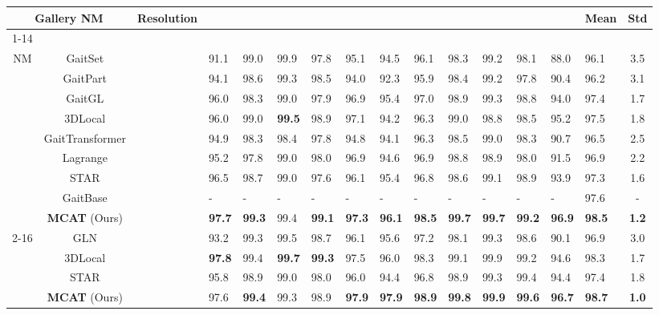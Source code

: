 \documentclass[journal]{IEEEtran}
\begin{document}
\begin{table*}[t]
\begin{center}
\footnotesize
\caption{Averaged rank-1 accuracies (\%) on CASIA-B, excluding identical-view cases. Std denotes the performance sample standard deviation across 11 views.}
\begin{tabular}{|c|c|c| l l l l l l l l l l l|l|c|}
\hline
\multicolumn{2}{|c|}{Gallery NM} & Resolution & \multicolumn{11}{c|}{} & \multirow{2}{*}{Mean} & \multirow{2}{*}{Std} \\\cline{1-14}
\multicolumn{2}{|c|}{Probe} &  &  &  &  &  &  &  &  &  &  &  &  & & \\\hline
\multirow{7}{*}{NM} & GaitSet\cite{chao2021gaitset} &  & 91.1 & 99.0 & 99.9 & 97.8 & 95.1 & 94.5 & 96.1 & 98.3 & 99.2 & 98.1 & 88.0 & 96.1 & 3.5\\
& GaitPart \cite{fan2020gaitpart} &  & 94.1 & 98.6 & 99.3 & 98.5 & 94.0 & 92.3 & 95.9 & 98.4 & 99.2 & 97.8 & 90.4 & 96.2 & 3.1 \\
& GaitGL \cite{GaitGL} &  & 96.0 & 98.3 & 99.0 & 97.9 & 96.9 & 95.4 & 97.0 & 98.9 & 99.3 & 98.8 & 94.0 & 97.4 & 1.7 \\
& 3DLocal \cite{local3D} &  & 96.0 & 99.0 & \textbf{99.5} & 98.9 & 97.1 & 94.2 & 96.3 & 99.0 & 98.8 & 98.5 & 95.2 & 97.5 & 1.8 \\
& GaitTransformer \cite{cui2022gaittransformer} &  & 94.9 & 98.3 & 98.4 & 97.8 & 94.8 & 94.1 & 96.3 & 98.5 & 99.0 & 98.3 & 90.7 & 96.5 & 2.5 \\
& Lagrange \cite{chai2022lagrange} &  & 95.2 & 97.8 & 99.0 & 98.0 & 96.9 & 94.6 & 96.9 & 98.8 & 98.9 & 98.0 & 91.5 & 96.9 & 2.2 \\
& STAR \cite{huang2022star} &  & 96.5 & 98.7 & 99.0 & 97.6 & 96.1 & 95.4 & 96.8 & 98.6 & 99.1 & 98.9 & 93.9 & 97.3 & 1.6 \\
& GaitBase \cite{fan2023opengait} &  & - & - & - & - & - & - & - & - & - & - & - & 97.6 & - \\
& \textbf{MCAT} (Ours) &  & \textbf{97.7} & \textbf{99.3} & 99.4 & \textbf{99.1} &\textbf{97.3} & \textbf{96.1} & \textbf{98.5} & \textbf{99.7} & \textbf{99.7} & \textbf{99.2} & \textbf{96.9} & \textbf{98.5} & \textbf{1.2} \\\cline{2-16}\cline{2-16}

& GLN \cite{hou2020gait} &  & 93.2 & 99.3 & 99.5 & 98.7 & 96.1 & 95.6 & 97.2 & 98.1 & 99.3 & 98.6 & 90.1 & 96.9 & 3.0 \\
& 3DLocal \cite{local3D} &  & \textbf{97.8} & 99.4 & \textbf{99.7} & \textbf{99.3} & 97.5 & 96.0 & 98.3 & 99.1 & 99.9 & 99.2 & 94.6 & 98.3 & 1.7 \\
& STAR \cite{huang2022star} &  & 95.8 & 98.9 & 99.0 & 98.0 & 96.0 & 94.4 & 96.8 & 98.9 & 99.3 & 99.4 & 94.4 & 97.4 & 1.8 \\
& \textbf{MCAT} (Ours) &  & 97.6 & \textbf{99.4} & 99.3 & 98.9 & \textbf{97.9} & \textbf{97.9} & \textbf{98.9} & \textbf{99.8} & \textbf{99.9} & \textbf{99.6} & \textbf{96.7} & \textbf{98.7} & \textbf{1.0} \\\hline


\end{tabular}
\end{center}
\end{table*}
\end{document}
